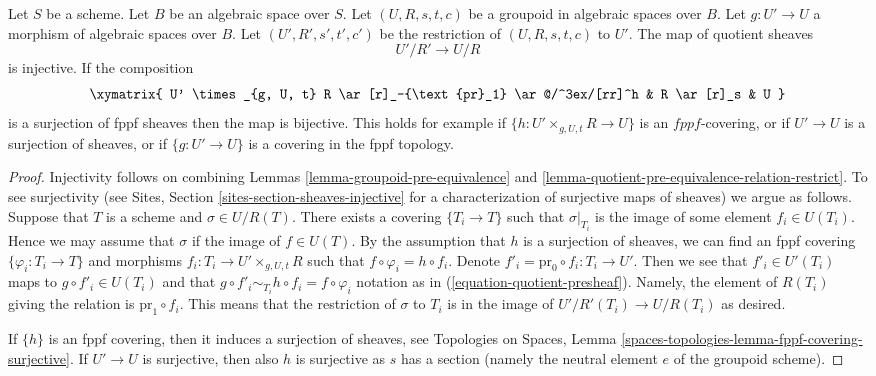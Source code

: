 \begin{lemma}
\label{lemma-quotient-groupoid-restrict}
Let $S$ be a scheme. Let $B$ be an algebraic space over $S$.
Let $(U, R, s, t, c)$ be a groupoid in algebraic spaces over $B$.
Let $g : U' \to U$ a morphism of algebraic spaces over $B$.
Let $(U', R', s', t', c')$ be the restriction of $(U, R, s, t, c)$ to $U'$.
The map of quotient sheaves
$$
U'/R' \longrightarrow U/R
$$
is injective. If the composition
$$
\xymatrix{
U' \times_{g, U, t} R \ar[r]_-{\text{pr}_1} \ar@/^3ex/[rr]^h
& R \ar[r]_s & U
}
$$
is a surjection of fppf sheaves then the map is bijective.
This holds for example if $\{h : U' \times_{g, U, t} R \to U\}$ is an
$fppf$-covering, or if $U' \to U$ is a surjection of sheaves, or if
$\{g : U' \to U\}$ is a covering in the fppf topology.
\end{lemma}

\begin{proof}
Injectivity follows on combining
Lemmas \ref{lemma-groupoid-pre-equivalence} and
\ref{lemma-quotient-pre-equivalence-relation-restrict}.
To see surjectivity (see
Sites, Section \ref{sites-section-sheaves-injective}
for a characterization of surjective maps of sheaves) we argue as follows.
Suppose that $T$ is a scheme and $\sigma \in U/R(T)$.
There exists a covering $\{T_i \to T\}$ such that $\sigma|_{T_i}$
is the image of some element $f_i \in U(T_i)$. Hence we
may assume that $\sigma$ if the image of $f \in U(T)$.
By the assumption that $h$ is a surjection of sheaves, we
can find an fppf covering $\{\varphi_i : T_i \to T\}$ and morphisms
$f_i : T_i \to U' \times_{g, U, t} R$ such that
$f \circ \varphi_i = h \circ f_i$. Denote
$f'_i = \text{pr}_0 \circ f_i : T_i \to U'$. Then we see that
$f'_i \in U'(T_i)$ maps to $g \circ f'_i \in U(T_i)$ and
that $g \circ f'_i \sim_{T_i} h \circ f_i = f \circ \varphi_i$
notation as in (\ref{equation-quotient-presheaf}). Namely, the
element of $R(T_i)$ giving the relation is $\text{pr}_1 \circ f_i$.
This means that the restriction
of $\sigma$ to $T_i$ is in the image of $U'/R'(T_i) \to U/R(T_i)$
as desired.

\medskip\noindent
If $\{h\}$ is an fppf covering, then it induces a surjection of sheaves, see
Topologies on Spaces,
Lemma \ref{spaces-topologies-lemma-fppf-covering-surjective}.
If $U' \to U$ is surjective, then also $h$ is surjective as $s$ has a section
(namely the neutral element $e$ of the groupoid scheme).
\end{proof}






